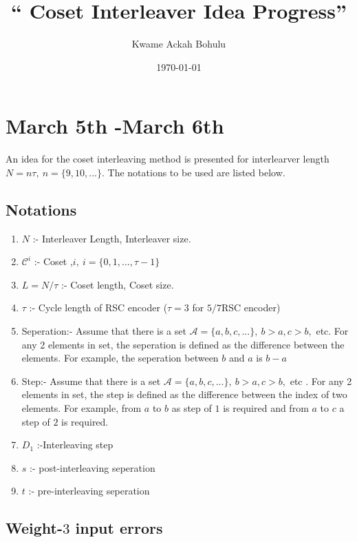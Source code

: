 \documentclass[11pt, oneside, dvipdfmx]{book}
\title{``
Coset Interleaver Idea Progress'' }
\author{Kwame Ackah Bohulu}
\date{\today}
\begin{document}
\maketitle




\section{March 5th -March 6th}
An idea for the coset interleaving method is presented for interlearver length $N=n\tau,~n=\{9,10,...\}$. 
The notations to be used are listed below.

 \subsection{Notations}
 \begin{enumerate}
 \item $N$ :- Interleaver Length, Interleaver size.
  \item $\mathcal{C}^i$ :- Coset ,$i,~i=\{0,1,...,\tau-1 \}$
 \item $L=N/\tau$ :- Coset length, Coset size.
 \item $\tau$ :- Cycle length of RSC encoder ($\tau= 3$ for $5/7$RSC encoder)
 
 \item Seperation:- Assume that there is a set $\mathcal{A}=\{a,b,c,...\},~b>a,c>b,$ etc. For any 2 elements in set, the seperation is defined as the difference between the elements. For example, the seperation between $b$ and $a$ is $b-a$
 \item Step:- Assume that there is a set $\mathcal{A}=\{a,b,c,...\},~b>a,c>b,$ etc . For any 2 elements in set, the step is defined as the difference between the index of two elements. For example, from $a$ to $b$ as step of $1$ is required and from $a$ to $c$ a step of $2$ is required.
 \item $D_1$ :-Interleaving step
 \item $s$ :- post-interleaving seperation
 \item $t$ :- pre-interleaving seperation

 \end{enumerate}
 
 \subsection{Weight-$3$ input errors}
 
\end{document}
